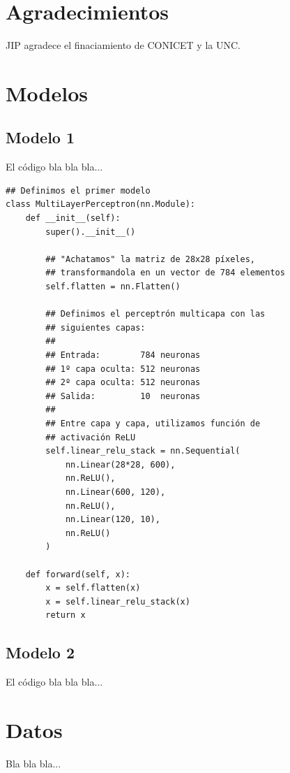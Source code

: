 \documentclass[aps,prl,twocolumn,groupedaddress]{revtex4-2}
\begin{document}
\section{Agradecimientos}

\begin{acknowledgments}
JIP agradece el finaciamiento de CONICET y la UNC.
\end{acknowledgments}



\onecolumngrid

\appendix

\section{Modelos}

\subsection{Modelo 1}

El código bla bla bla...

\begin{verbatim}
## Definimos el primer modelo
class MultiLayerPerceptron(nn.Module):
    def __init__(self):
        super().__init__()

        ## "Achatamos" la matriz de 28x28 píxeles, 
        ## transformandola en un vector de 784 elementos
        self.flatten = nn.Flatten()

        ## Definimos el perceptrón multicapa con las
        ## siguientes capas:
        ##
        ## Entrada:        784 neuronas
        ## 1º capa oculta: 512 neuronas
        ## 2º capa oculta: 512 neuronas
        ## Salida:         10  neuronas
        ##
        ## Entre capa y capa, utilizamos función de 
        ## activación ReLU
        self.linear_relu_stack = nn.Sequential(
            nn.Linear(28*28, 600),
            nn.ReLU(),
            nn.Linear(600, 120),
            nn.ReLU(),
            nn.Linear(120, 10),
            nn.ReLU()
        )

    def forward(self, x):
        x = self.flatten(x)
        x = self.linear_relu_stack(x)
        return x
\end{verbatim}

\subsection{Modelo 2}

El código bla bla bla...

\section{Datos}

Bla bla bla...
\end{document}
